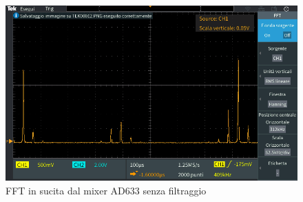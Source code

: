 \documentclass[titlepage]{report}
\begin{document}
	

	\begin{figure}[H]
		\centering
		\includegraphics[scale = 0.5]{Immagini/ad633_fft_mixed.PNG}
		\caption{FFT in sucita dal mixer AD633 senza filtraggio}
		\label{fig:FFTAD633}
	\end{figure}


	\label{ch:Risultati}
	

\newpage
\end{document}
